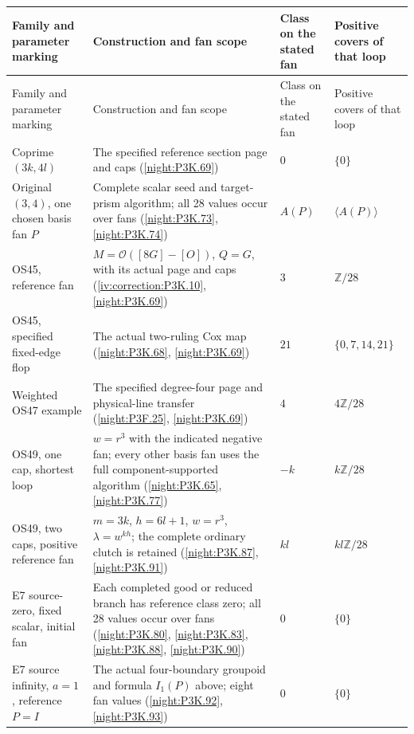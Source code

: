 \begingroup
\small
\setlength{\tabcolsep}{4pt}
\renewcommand{\arraystretch}{1.18}
\begin{longtable}{@{}p{.23\linewidth}p{.37\linewidth}p{.16\linewidth}p{.17\linewidth}@{}}
\toprule
Family and parameter marking & Construction and fan scope
 & Class on the stated fan & Positive covers of that loop\\
\midrule
\endfirsthead
\toprule
Family and parameter marking & Construction and fan scope
 & Class on the stated fan & Positive covers of that loop\\
\midrule
\endhead
\bottomrule
\endfoot
Coprime $(3k,4l)$ & The specified reference section page and caps
  (\cref{night:P3K.69}) & $0$ & $\{0\}$\\
Original $(3,4)$, one chosen basis fan $P$ & Complete scalar
  seed and target-prism algorithm; all 28 values occur over fans
  (\cref{night:P3K.73}, \cref{night:P3K.74})
  & $A(P)$ & $\langle A(P)\rangle$\\
OS45, reference fan & $M=\mathcal O([8G]-[O])$, $Q=G$,
  with its actual page and caps
  (\cref{iv:correction:P3K.10}, \cref{night:P3K.69})
  & $3$ & $\mathbb Z/28$\\
OS45, specified fixed-edge flop & The actual two-ruling Cox map
  (\cref{night:P3K.68}, \cref{night:P3K.69})
  & $21$ & $\{0,7,14,21\}$\\
Weighted OS47 example & The specified degree-four page and
  physical-line transfer (\cref{night:P3F.25}, \cref{night:P3K.69})
  & $4$ & $4\mathbb Z/28$\\
OS49, one cap, shortest loop & $w=r^3$ with the indicated
  negative fan; every other basis fan uses the full component-supported
  algorithm (\cref{night:P3K.65}, \cref{night:P3K.77})
  & $-k$ & $k\mathbb Z/28$\\
OS49, two caps, positive reference fan & $m=3k$, $h=6l+1$,
  $w=r^3$, $\lambda=w^{kh}$; the complete ordinary clutch is retained
  (\cref{night:P3K.87}, \cref{night:P3K.91})
  & $kl$ & $kl\mathbb Z/28$\\
E7 source-zero, fixed scalar, initial fan & Each completed good
  or reduced branch has reference class zero; all 28 values occur
  over fans (\cref{night:P3K.80}, \cref{night:P3K.83}, \cref{night:P3K.88}, \cref{night:P3K.90})
  & $0$ & $\{0\}$\\
E7 source infinity, $a=1$, reference $P=I$ & The actual four-boundary
  groupoid and formula $I_1(P)$ above; eight fan values
  (\cref{night:P3K.92}, \cref{night:P3K.93})
  & $0$ & $\{0\}$\\

\end{longtable}
